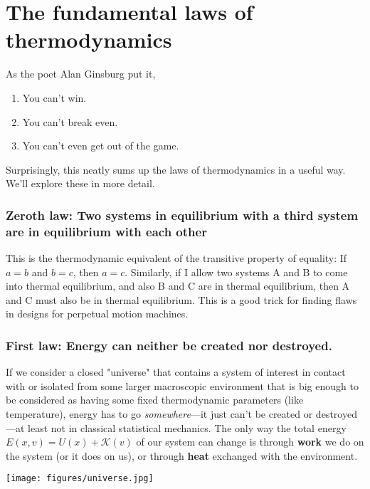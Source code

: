 \documentclass[english,course]{lecture}
\begin{document}
\eject
{}

\section{The fundamental laws of thermodynamics}

As the poet Alan Ginsburg put it, 
\begin{enumerate}
\item You can't win.
\item You can't break even.
\item You can't even get out of the game.
\end{enumerate}
Surprisingly, this neatly sums up the laws of thermodynamics in a useful way.
We'll explore these in more detail.

\subsubsection{Zeroth law: Two systems in equilibrium with a third system are in equilibrium with each other}

This is the thermodynamic equivalent of the transitive property of equality: If $a = b$ and $b = c$, then $a = c$.
Similarly, if I allow two systems A and B to come into thermal equilibrium, and also B and C are in thermal equilibrium, then A and C must also be in thermal equilibrium.
This is a good trick for finding flaws in designs for perpetual motion machines.

\subsubsection{First law: Energy can neither be created nor destroyed.}

If we consider a closed "universe" that contains a system of interest in contact with or isolated from some larger macroscopic environment that is big enough to be considered as having some fixed thermodynamic parameters (like temperature), energy has to go \emph{somewhere}---it just can't be created or destroyed---at least not in classical statistical mechanics.
The only way the total energy $E(x,v) = U(x) + \mathcal{K}(v)$ of our system can change is through {\bf work} we do on the system (or it does on us), or through {\bf heat} exchanged with the environment.

\begin{centering}
\texttt{[image: figures/universe.jpg]}

\end{centering}
\end{document}
